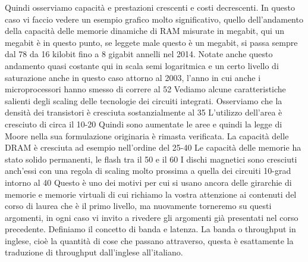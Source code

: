 Quindi osserviamo capacità e prestazioni crescenti e costi decrescenti.
In questo caso vi faccio vedere un esempio grafico molto significativo, quello dell'andamento della capacità delle memorie dinamiche di RAM misurate in megabit, qui un megabit è in questo punto, se leggete male questo è un megabit, si passa sempre dal 78 da 16 kilobit fino a 8 gigabit annelli nel 2014.
Notate anche questo andamento quasi costante qui in scala semi logaritmica e un certo livello di saturazione anche in questo caso attorno al 2003, l'anno in cui anche i microprocessori hanno smesso di correre al 52%
Vediamo alcune caratteristiche salienti degli scaling delle tecnologie dei circuiti integrati.
Osserviamo che la densità dei transistori è cresciuta sostanzialmente al 35%
L'utilizzo dell'area è cresciuto di circa il 10-20%
Quindi sono aumentate le aree e quindi la legge di Moore nella sua formulazione originaria è rimasta verificata.
La capacità delle DRAM è cresciuta ad esempio nell'ordine del 25-40%
Le capacità delle memorie ha stato solido permanenti, le flash tra il 50 e il 60%
I dischi magnetici sono cresciuti anch'essi con una regola di scaling molto prossima a quella dei circuiti 10-grad intorno al 40%
Questo è uno dei motivi per cui si usano ancora delle girarchie di memorie e memorie virtuali di cui richiamo la vostra attenzione ai contenuti del corso di laurea che è il primo livello, ma nuovamente torneremo su questi argomenti, in ogni caso vi invito a rivedere gli argomenti già presentati nel corso precedente.
Definiamo il concetto di banda e latenza.
La banda o throughput in inglese, cioè la quantità di cose che passano attraverso, questa è esattamente la traduzione di throughput dall'inglese all'italiano.
